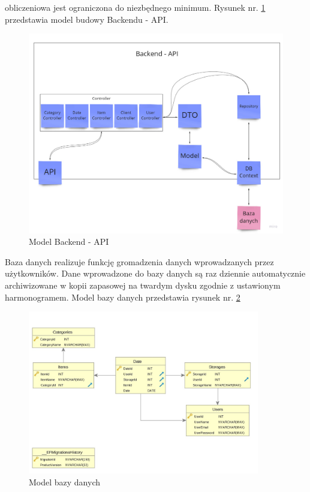 \documentclass[12pt,a4paper]{article}
\begin{document}
			obliczeniowa jest ograniczona do niezbędnego minimum. Rysunek nr. \ref{fig:api_model} przedstawia model budowy Backendu - API.\\
		\begin{figure}[h]
			\centering
			\includegraphics[width=\textwidth]{img/Backend-API_model.jpg}
			\caption{Model Backend - API}
			\label{fig:api_model}
		\end{figure}
		\indent Baza danych realizuje funkcję gromadzenia danych wprowadzanych przez użytkowników. Dane wprowadzone do bazy danych są raz dziennie automatycznie archiwizowane
			w kopii zapasowej na twardym dysku zgodnie z ustawionym harmonogramem. Model bazy danych przedstawia rysunek nr. \ref{fig:db_model}\\
		\begin{figure}[H]
			\centering
			\includegraphics[width=0.9\textwidth]{img/model_bazy_danych.jpg}
			\caption{Model bazy danych}
		\label{fig:db_model}
		\end{figure}
\end{document}

